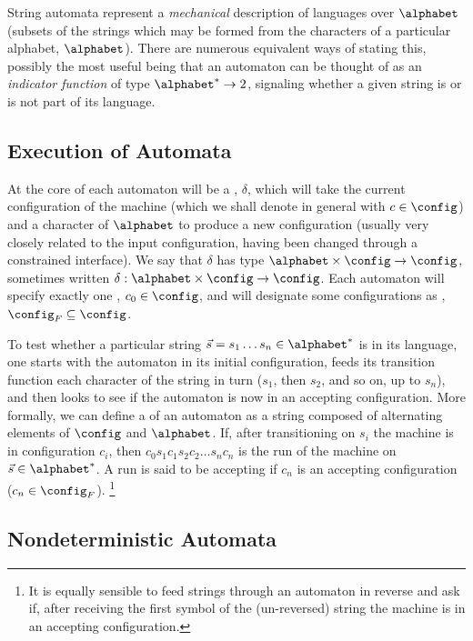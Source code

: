 String automata represent a {\em mechanical} description of languages over
$\alphabet$ (\ie subsets of the strings which may be formed from the
characters of a particular alphabet, $\alphabet$).  There are numerous
equivalent ways of stating this, possibly the most useful being that an
automaton can be thought of as an {\em indicator function} of type $\alphabet^*
\to 2$, signaling whether a given string is or is not part of its language.

\subsection{Execution of Automata}

At the core of each automaton will be a ,
$\delta$, which will take the current configuration of the machine (which we
shall denote in general with $c \in \config$) and a character of $\alphabet$ to
produce a new configuration (usually very closely related to the input
configuration, having been changed through a constrained interface).  We say
that $\delta$ has type $\alphabet \times \config \to \config$, sometimes
written $\delta : \alphabet \times \config \to \config$.  Each automaton will
specify exactly one , $c_0 \in \config$, and
will designate some configurations as ,
$\config_F \subseteq \config$.

To test whether a particular string $\vec{s} = s_1 \ldots s_n \in \alphabet^*$
is in its language, one starts with the automaton in its initial
configuration, feeds its transition function each character of the string in
turn (\ie $s_1$, then $s_2$, and so on, up to $s_n$), and then looks to see
if the automaton is now in an accepting configuration.  More formally, we
can define a  of an automaton as a string composed of alternating
elements of $\config$ and $\alphabet$.  If, after transitioning on $s_i$ the
machine is in configuration $c_i$, then $c_0 s_1 c_1 s_2 c_2 \ldots s_n c_n$
is the run of the machine on $\vec{s} \in \alphabet^*$.  A run is said to be
accepting if $c_n$ is an accepting configuration (\ie $c_n \in \config_F$).%
%
\footnote{It is equally sensible to feed strings through an automaton in
reverse and ask if, after receiving the first symbol of the (un-reversed)
string the machine is in an accepting configuration.}

\subsection{Nondeterministic Automata}

